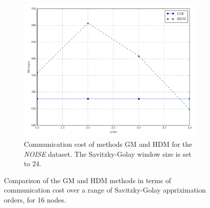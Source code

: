 \begin{figure}[!h]
\begin{subfigure}{0.32\textwidth}
\end{subfigure}\hfill
\begin{subfigure}{0.32\textwidth}%
  \includegraphics[width=\linewidth]{img/main_msg_noisyinterweaving_order.pdf}
  \caption{Communication cost of methods GM and HDM for the \emph{NOISE} dataset. The Savitzky-Golay window size is set to 24.}
\end{subfigure}
\vspace{0.5cm}
\caption{Comparison of the GM and HDM methods in terms of communication cost over a range of Savitzky-Golay appriximation orders, for 16 nodes.} \label{fig:mainComp-order}
\end{figure}
